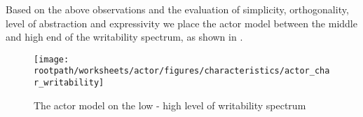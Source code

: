 Based on the above observations and the evaluation of simplicity, orthogonality, level of abstraction and expressivity we place the actor model between the middle and high end of the writability spectrum, as shown in .

\begin{figure}[htbp]
\centering
 \texttt{[image: \\rootpath/worksheets/actor/figures/characteristics/actor\_char\_writability]} 
 \caption{The actor model on the low - high level of writability spectrum}
\label{fig:actor_writability}
\end{figure}


\worksheetend
